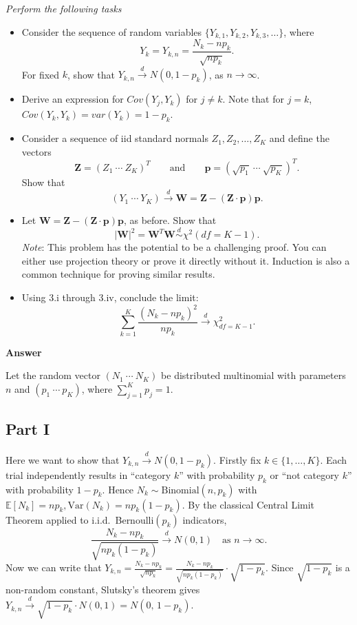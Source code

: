 \documentclass[letterpaper]{article}
\begin{document}
		\emph{Perform the following tasks}
		\begin{itemize}
			\item[(i)] Consider the sequence of random variables $\{Y_{k,1}, Y_{k,2}, Y_{k,3}, \ldots\}$, where
			\[
			Y_k = Y_{k,n} = \frac{N_k - np_k}{\sqrt{np_k}}.
			\]
			For fixed $k$, show that $Y_{k,n} \xrightarrow{d} N(0, 1 - p_k)$, as $n \to \infty$.
			
			\item[(ii)] Derive an expression for $Cov(Y_j, Y_k)$ for $j \neq k$. Note that for $j = k$, $Cov(Y_k, Y_k) = var(Y_k) = 1 - p_k$.
			
			\item[(iii)] Consider a sequence of iid standard normals $Z_1, Z_2, \ldots, Z_K$ and define the vectors
			\[
			\mathbf{Z} = (Z_1 \ \cdots \ Z_K)^T \qquad \text{and} \qquad \mathbf{p} = (\sqrt{p_1} \ \cdots \ \sqrt{p_K})^T.
			\]
			Show that
			\[
			(Y_1 \ \cdots \ Y_K) \xrightarrow{d} \mathbf{W} = \mathbf{Z} - (\mathbf{Z} \cdot \mathbf{p})\mathbf{p}.
			\]
			
			\item[(iv)] Let $\mathbf{W} = \mathbf{Z} - (\mathbf{Z} \cdot \mathbf{p})\mathbf{p}$, as before. Show that
			\[
			|\mathbf{W}|^2 = \mathbf{W}^T \mathbf{W} \overset{d}{\sim} \chi^2(df = K - 1).
			\]
			\emph{Note}: This problem has the potential to be a challenging proof. You can either use projection theory or prove it directly without it. Induction is also a common technique for proving similar results.
			
			\item[(v)] Using 3.i through 3.iv, conclude the limit:
			\[
			\sum_{k=1}^{K} \frac{(N_k - np_k)^2}{np_k} \xrightarrow{d} \chi^2_{df=K-1}.
			\]
		\end{itemize}
		
		\textbf{Answer}
		
		Let the random vector $(N_1\ \cdots\ N_K)$ be distributed multinomial with parameters $n$ and
		$(p_1\ \cdots\ p_K)$, where $\sum_{j=1}^{K} p_j = 1$.
		
		
		\subsection{Part I}
		
		 Here we want to {show that $Y_{k,n} \xrightarrow{d} N(0,1-p_k)$.}
			Firstly fix $k \in \{1,\ldots,K\}$. Each trial independently results in ``category $k$'' with
			probability $p_k$ or ``not category $k$'' with probability $1-p_k$. Hence $N_k \sim
			\mathrm{Binomial}(n, p_k)$ with
			$
			\mathbb{E}[N_k] = np_k,  \mathrm{Var}(N_k) = np_k(1-p_k).
			$
			By the classical Central Limit Theorem applied to i.i.d.\ Bernoulli$(p_k)$ indicators,
			\[
			\frac{N_k - np_k}{\sqrt{np_k(1-p_k)}} \xrightarrow{d} N(0,1) \quad \text{as } n\to\infty.
			\]
			Now we can write that
			$
			Y_{k,n} = \frac{N_k - np_k}{\sqrt{np_k}}
			= \frac{N_k - np_k}{\sqrt{np_k(1-p_k)}} \cdot \sqrt{1-p_k}.
			$
			Since $\sqrt{1-p_k}$ is a non-random constant, Slutsky's theorem gives
			$
			Y_{k,n} \xrightarrow{d} \sqrt{1-p_k}\cdot N(0,1) = N\!\left(0,\,1-p_k\right). 
			$
			
\end{document}
